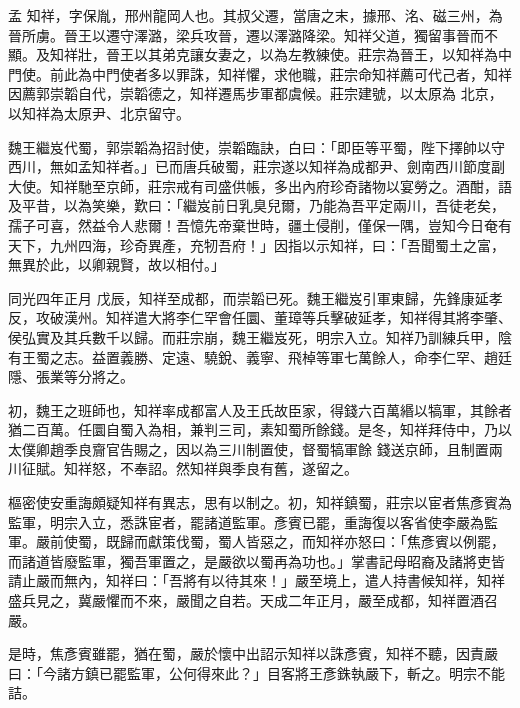 
\begin{pinyinscope}

 孟
 知祥，字保胤，邢州龍岡人也。其叔父遷，當唐之末，據邢、洺、磁三州，為晉所虜。晉王以遷守澤潞，梁兵攻晉，遷以澤潞降梁。知祥父道，獨留事晉而不顯。及知祥壯，晉王以其弟克讓女妻之，以為左教練使。莊宗為晉王，以知祥為中門使。前此為中門使者多以罪誅，知祥懼，求他職，莊宗命知祥薦可代己者，知祥因薦郭崇韜自代，崇韜德之，知祥遷馬步軍都虞候。莊宗建號，以太原為
 北京，以知祥為太原尹、北京留守。



 魏王繼岌代蜀，郭崇韜為招討使，崇韜臨訣，白曰：「即臣等平蜀，陛下擇帥以守西川，無如孟知祥者。」已而唐兵破蜀，莊宗遂以知祥為成都尹、劍南西川節度副大使。知祥馳至京師，莊宗戒有司盛供帳，多出內府珍奇諸物以宴勞之。酒酣，語及平昔，以為笑樂，歎曰：「繼岌前日乳臭兒爾，乃能為吾平定兩川，吾徒老矣，孺子可喜，然益令人悲爾！吾憶先帝棄世時，疆土侵削，僅保一隅，豈知今日奄有天下，九州四海，珍奇異產，充牣吾府！」因指以示知祥，曰：「吾聞蜀土之富，無異於此，以卿親賢，故以相付。」



 同光四年正月
 戊辰，知祥至成都，而崇韜已死。魏王繼岌引軍東歸，先鋒康延孝反，攻破漢州。知祥遣大將李仁罕會任圜、董璋等兵擊破延孝，知祥得其將李肇、侯弘實及其兵數千以歸。而莊宗崩，魏王繼岌死，明宗入立。知祥乃訓練兵甲，陰有王蜀之志。益置義勝、定遠、驍銳、義寧、飛棹等軍七萬餘人，命李仁罕、趙廷隱、張業等分將之。



 初，魏王之班師也，知祥率成都富人及王氏故臣家，得錢六百萬緡以犒軍，其餘者猶二百萬。任圜自蜀入為相，兼判三司，素知蜀所餘錢。是冬，知祥拜侍中，乃以太僕卿趙季良齎官告賜之，因以為三川制置使，督蜀犒軍餘
 錢送京師，且制置兩川征賦。知祥怒，不奉詔。然知祥與季良有舊，遂留之。



 樞密使安重誨頗疑知祥有異志，思有以制之。初，知祥鎮蜀，莊宗以宦者焦彥賓為監軍，明宗入立，悉誅宦者，罷諸道監軍。彥賓已罷，重誨復以客省使李嚴為監軍。嚴前使蜀，既歸而獻策伐蜀，蜀人皆惡之，而知祥亦怒曰：「焦彥賓以例罷，而諸道皆廢監軍，獨吾軍置之，是嚴欲以蜀再為功也。」掌書記母昭裔及諸將吏皆請止嚴而無內，知祥曰：「吾將有以待其來！」嚴至境上，遣人持書候知祥，知祥盛兵見之，冀嚴懼而不來，嚴聞之自若。天成二年正月，嚴至成都，知祥置酒召嚴。



 是時，焦彥賓雖罷，猶在蜀，嚴於懷中出詔示知祥以誅彥賓，知祥不聽，因責嚴曰：「今諸方鎮已罷監軍，公何得來此？」目客將王彥銖執嚴下，斬之。明宗不能詰。




\end{pinyinscope}
